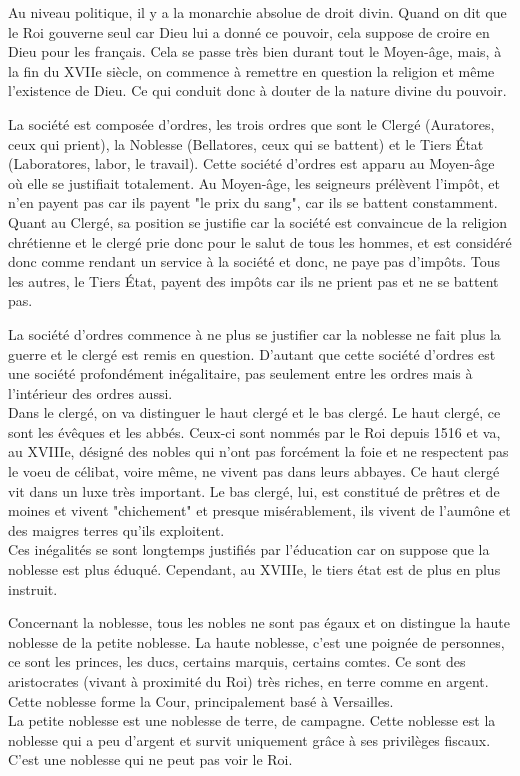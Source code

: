 \documentclass[10pt, a4paper, openany]{book}
\begin{document}
Au niveau politique, il y a la monarchie absolue de droit divin. Quand on dit que le Roi gouverne seul car Dieu lui a donné ce pouvoir, cela suppose de croire en Dieu pour les français. Cela se passe très bien durant tout le Moyen-âge, mais, à la fin du XVIIe siècle, on commence à remettre en question la religion et même l'existence de Dieu. Ce qui conduit donc à douter de la nature divine du pouvoir.


La société est composée d'ordres, les trois ordres que sont le Clergé (Auratores, ceux qui prient), la Noblesse (Bellatores, ceux qui se battent) et le Tiers État (Laboratores, labor, le travail). Cette société d'ordres est apparu au Moyen-âge où elle se justifiait totalement. Au Moyen-âge, les seigneurs prélèvent l'impôt, et n'en payent pas car ils payent "le prix du sang", car ils se battent constamment. Quant au Clergé, sa position se justifie car la société est convaincue de la religion chrétienne et le clergé prie donc pour le salut de tous les hommes, et est considéré donc comme rendant un service à la société et donc, ne paye pas d'impôts. Tous les autres, le Tiers État, payent des impôts car ils ne prient pas et ne se battent pas.


La société d'ordres commence à ne plus se justifier car la noblesse ne fait plus la guerre et le clergé est remis en question. D'autant que cette société d'ordres est une société profondément inégalitaire, pas seulement entre les ordres mais à l'intérieur des ordres aussi. \\
Dans le clergé, on va distinguer le haut clergé et le bas clergé. Le haut clergé, ce sont les évêques et les abbés. Ceux-ci sont nommés par le Roi depuis 1516 et va, au XVIIIe, désigné des nobles qui n'ont pas forcément la foie et ne respectent pas le voeu de célibat, voire même, ne vivent pas dans leurs abbayes. Ce haut clergé vit dans un luxe très important. Le bas clergé, lui, est constitué de prêtres et de moines et vivent "chichement" et presque misérablement, ils vivent de l'aumône et des maigres terres qu'ils exploitent. \\
Ces inégalités se sont longtemps justifiés par l'éducation car on suppose que la noblesse est plus éduqué. Cependant, au XVIIIe, le tiers état est de plus en plus instruit. 


Concernant la noblesse, tous les nobles ne sont pas égaux et on distingue la haute noblesse de la petite noblesse. La haute noblesse, c'est une poignée de personnes, ce sont les princes, les ducs, certains marquis, certains comtes. Ce sont des aristocrates (vivant à proximité du Roi) très riches, en terre comme en argent. Cette noblesse forme la Cour, principalement basé à Versailles. \\
La petite noblesse est une noblesse de terre, de campagne. Cette noblesse est la noblesse qui a peu d'argent et survit uniquement grâce à ses privilèges fiscaux. C'est une noblesse qui ne peut pas voir le Roi.
\end{document}
